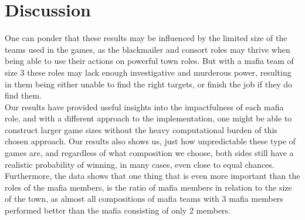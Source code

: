 \section{Discussion}\label{sec:discussion}
One can ponder that these results may be influenced by the 
limited size of the teams used in the games, as the 
blackmailer and consort roles may 
thrive when being able to
use
their actions on powerful town roles. But with a mafia team 
of size 3 these roles may lack enough investigative and
murderous power, resulting in them being either unable to 
find the right targets, or finish the job if they do find 
them.\\
Our results have provided useful insights into the 
impactfulness of each mafia role, and with a different 
approach to the implementation, one might be able to 
construct larger game sizes without the heavy computational 
burden of this chosen approach. Our results also shows us, 
just how unpredictable these type of games are, and regardless of what composition we choose,
both sides still have a realistic probability of winning, in 
many cases, even close to equal chances.\\
Furthermore, the data shows that one thing that is even more 
important than the roles of the mafia members, is the ratio 
of mafia members in relation to the size of the town, as 
almost all compositions of mafia teams with 3 mafia members 
performed better than the mafia consisting of only 2 members. 